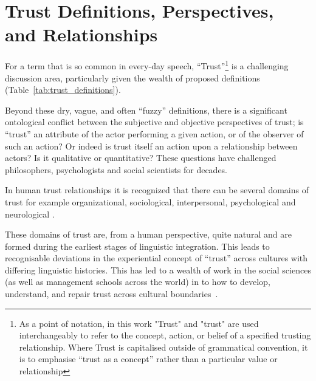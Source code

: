 \section{Trust Definitions, Perspectives, and Relationships}\label{sec:trust_defs}
For a term that is so common in every-day speech, ``Trust''\footnote{As a point of notation, in this work "Trust" and "trust" are used interchangeably to refer to the concept, action, or belief of a specified trusting relationship. Where Trust is capitalised outside of grammatical convention, it is to emphasise ``trust as a concept'' rather than a particular value or relationship} is a challenging discussion area, particularly given the wealth of proposed definitions (Table~\ref{tab:trust_definitions}).

Beyond these dry, vague, and often ``fuzzy'' definitions, there is a significant ontological conflict between the subjective and objective perspectives of trust; is ``trust'' an attribute of the actor performing a given action, or of the observer of such an action? Or indeed is trust itself an action upon a relationship between actors? Is it qualitative or quantitative? These questions have challenged philosophers, psychologists and social scientists for decades.

In human trust relationships it is recognized that there can be several domains of trust for example organizational, sociological, interpersonal, psychological and neurological \cite{Lee2004}.

These domains of trust are, from a human perspective, quite natural and are formed during the earliest stages of linguistic integration.
This leads to recognisable deviations in the experiential concept of ``trust'' across cultures with differing linguistic histories.
This has led to a wealth of work in the social sciences (as well as management schools across the world) in to how to develop, understand, and repair trust across cultural boundaries~\cite{Okumura2011}.


